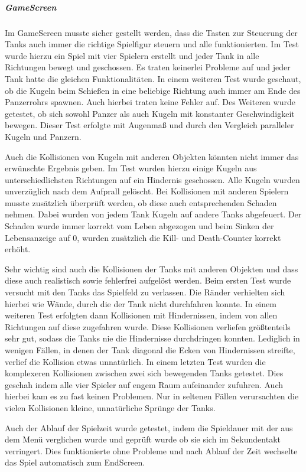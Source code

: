 \documentclass[a4paper]{scrreprt}
\begin{document}
\subparagraph{GameScreen}
Im GameScreen musste sicher gestellt werden, dass die Tasten zur Steuerung der Tanks auch immer die richtige Spielfigur steuern und alle funktionierten. Im Test wurde hierzu ein Spiel mit vier Spielern erstellt und jeder Tank in alle Richtungen bewegt und geschossen. Es traten keinerlei Probleme auf und jeder Tank hatte die gleichen Funktionalitäten. In einem weiteren Test wurde geschaut, ob die Kugeln beim Schießen in eine beliebige Richtung auch immer am Ende des Panzerrohrs spawnen. Auch hierbei traten keine Fehler auf. Des Weiteren wurde getestet, ob sich sowohl Panzer als auch Kugeln mit konstanter Geschwindigkeit bewegen. Dieser Test erfolgte mit Augenmaß und durch den Vergleich paralleler Kugeln und Panzern.
		

Auch die Kollisionen von Kugeln mit anderen Objekten könnten nicht immer das erwünschte Ergebnis geben. Im Test wurden hierzu einige Kugeln aus unterschiedlichsten Richtungen auf ein Hindernis geschossen. Alle Kugeln wurden unverzüglich nach dem Aufprall gelöscht. Bei Kollisionen mit anderen Spielern musste zusätzlich überprüft werden, ob diese auch entsprechenden Schaden nehmen. Dabei wurden von jedem Tank Kugeln auf andere Tanks abgefeuert. Der Schaden wurde immer korrekt vom Leben abgezogen und beim Sinken der Lebensanzeige auf 0, wurden zusätzlich die Kill- und Death-Counter korrekt erhöht.
		
		
Sehr wichtig sind auch die Kollisionen der Tanks mit anderen Objekten und dass diese auch realistisch sowie fehlerfrei aufgelöst werden. Beim ersten Test wurde versucht mit den Tanks das Spielfeld zu verlassen. Die Ränder verhielten sich hierbei wie Wände, durch die der Tank nicht durchfahren konnte. In einem weiteren Test erfolgten dann Kollisionen mit Hindernissen, indem von allen Richtungen auf diese zugefahren wurde. Diese Kollisionen verliefen größtenteils sehr gut, sodass die Tanks nie die Hindernisse durchdringen konnten. Lediglich in wenigen Fällen, in denen der Tank diagonal die Ecken von Hindernissen streifte, verlief die Kollision etwas unnatürlich. In einem letzten Test wurden die komplexeren Kollisionen zwischen zwei sich bewegenden Tanks getestet. Dies geschah indem alle vier Spieler auf engem Raum aufeinander zufuhren. Auch hierbei kam es zu fast keinen Problemen. Nur in seltenen Fällen verursachten die vielen Kollisionen kleine, unnatürliche Sprünge der Tanks.
		
		Auch der Ablauf der Spielzeit wurde getestet, indem die Spieldauer mit der aus dem Menü verglichen wurde und geprüft wurde ob sie sich im Sekundentakt verringert. Dies funktionierte ohne Probleme und nach Ablauf der Zeit wechselte das Spiel automatisch zum EndScreen.
		
\end{document}
